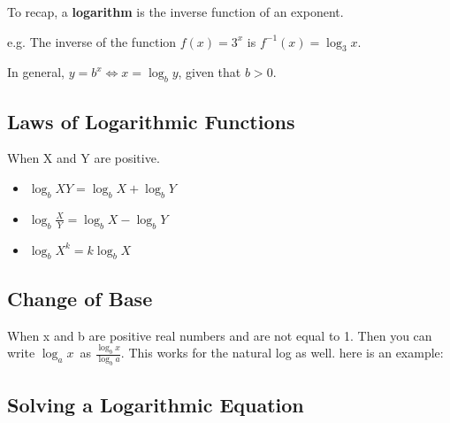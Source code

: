 To recap, a \textbf{logarithm} is the inverse function of an exponent.



e.g. The inverse of the function $f(x) = 3^x$ is $f^{-1}(x) = \log _3 x$.



In general, $y = b^x \iff x = \log _b y$, given that $b > 0$.




\subsection{Laws of Logarithmic Functions}
\label{sss:laws-71be}




When X and Y are positive.



\begin{itemize}
    \item $\log _bXY = \log _bX + \log _bY\,$
    \item $\log _b \frac{X}{Y} = \log _bX - \log _bY\,$
    \item $\log _b X^k = k \log _bX\,$
\end{itemize}


\subsection{Change of Base}
\label{sss:chan-d752}




When x and b are positive real numbers and are not equal to 1. Then you can write $\log _a
x\,$ as $\frac { \log _b x}{ \log _b a}$. This works for the natural log as well. here is
an example:




\subsection{Solving a Logarithmic Equation}
\label{sss:solv-e353}




